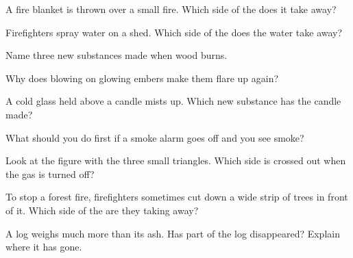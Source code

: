 \begin{exercise}[$\star$]\label{exo:g4:what-a-fire-needs:3}
A fire blanket is thrown over a small fire. Which side of the  does it take away?
\end{exercise}

\begin{exercise}[$\star$]\label{exo:g4:what-a-fire-needs:4}
Firefighters spray water on a  shed. Which side of the  does the water take away?
\end{exercise}

\begin{exercise}[$\star$]\label{exo:g4:what-a-fire-needs:5}
Name three new substances made when wood burns.
\end{exercise}

\begin{exercise}[$\star$]\label{exo:g4:what-a-fire-needs:6}
Why does blowing on glowing embers make them flare up again?
\end{exercise}

\begin{exercise}[$\star$]\label{exo:g4:what-a-fire-needs:7}
A cold glass held above a candle mists up. Which new substance has the
candle made?
\end{exercise}

\begin{exercise}[$\star$]\label{exo:g4:what-a-fire-needs:8}
What should you do first if a smoke alarm goes off and you see smoke?
\end{exercise}

\begin{exercise}[$\star$]\label{exo:g4:what-a-fire-needs:9}
Look at the figure with the three small triangles. Which side is crossed
out when the gas is turned off?
\end{exercise}

\begin{exercise}[$\star\star$]\label{exo:g4:what-a-fire-needs:10}
To stop a forest fire, firefighters sometimes cut down a wide strip of
trees in front of it. Which side of the  are they taking
away?
\end{exercise}

\begin{exercise}[$\star\star$]\label{exo:g4:what-a-fire-needs:11}
A log weighs much more than its ash. Has part of the log disappeared?
Explain where it has gone.
\end{exercise}
